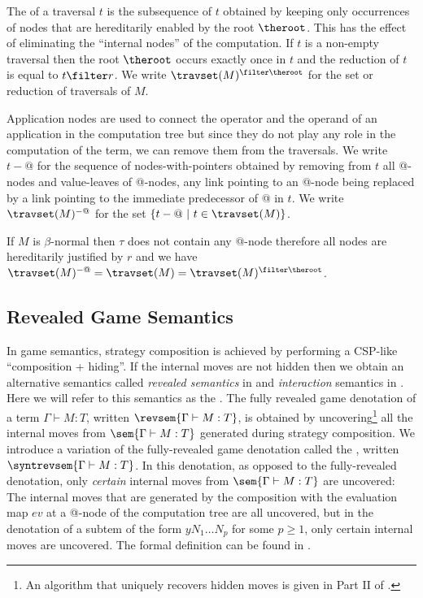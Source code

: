 The  of a traversal $t$ is the subsequence of $t$ obtained by keeping only occurrences of nodes that are hereditarily enabled by the root $\theroot$. This has the effect of eliminating the ``internal nodes'' of the computation. If $t$ is a non-empty traversal then the root $\theroot$ occurs exactly once in $t$ and the reduction of $t$ is equal to $t \filter r$. We write $\travset(M)^{\filter \theroot}$ for the set or reduction of traversals of $M$.

Application nodes are used to connect the operator and the operand of an application in the computation tree but since they do not play any role in the computation of the term, we can remove them from the traversals.  We write $t-@$ for the sequence of nodes-with-pointers obtained by removing from $t$ all @-nodes and value-leaves of @-nodes, any link pointing to an @-node being replaced by a link pointing to the immediate predecessor of @ in $t$. We write $\travset(M)^{-@}$ for the set $\{ t - @ \ | \  t \in \travset(M) \}$.
\begin{remark}
If $M$ is $\beta$-normal then $\tau$ does not contain any @-node therefore all nodes are hereditarily justified by $r$ and we have $\travset(M)^{-@} = \travset(M) = \travset(M)^{\filter \theroot }$.
\end{remark}

\subsection{Revealed Game Semantics}

In game semantics, strategy composition is achieved by performing a CSP-like ``composition + hiding''. If the internal moves are not hidden then we obtain an alternative semantics called \emph{revealed semantics} in \cite{willgreenlandthesis} and \emph{interaction} semantics in \cite{DBLP:conf/sas/DimovskiGL05}. Here we will refer to this semantics as the . The fully revealed game denotation of a term $\Gamma \vdash M :T$, written $\revsem{\Gamma \vdash M : T}$, is obtained by uncovering\footnote{An algorithm that uniquely recovers hidden moves is given in Part II of
  \cite{hylandong_pcf}.} all the internal moves from $\sem{\Gamma \vdash
  M : T}$ generated during strategy composition.
We introduce a variation of the fully-revealed game denotation called the , written $\syntrevsem{\Gamma \vdash
  M : T}$. In this denotation, as opposed to the fully-revealed denotation,
only \emph{certain} internal moves from $\sem{\Gamma \vdash
  M : T}$ are uncovered: The internal moves that are generated by the composition with the evaluation map
$ev$ at a @-node of the computation tree are all uncovered, but in the denotation of a subtem of the form $y N_1 \ldots N_p$ for some $p\geq1$, only certain internal moves are uncovered. The formal definition can be found in \cite{localbeta2008}.


